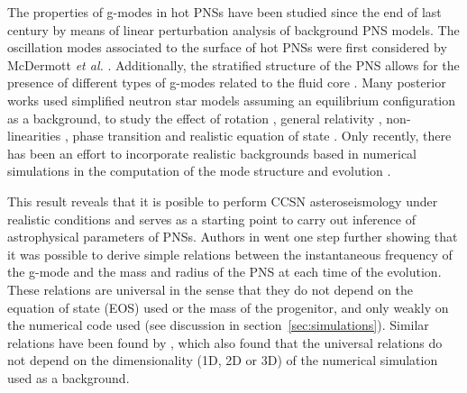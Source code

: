  
 The {properties of} g-modes in hot {PNSs} have been studied since the end of last century {by means of linear perturbation analysis of background PNS models}. The oscillation modes {associated to} the surface of hot PNSs were first considered by McDermott {\it et al.} \citep{McDermott:1983}. Additionally, the stratified structure of the PNS allows for the presence of different types of g-modes related to the fluid core \citep{Reisenegger:1992}. Many posterior works used simplified neutron star models assuming an equilibrium configuration {as a background}, to study the effect of rotation \citep{Ferrari:2004}, general relativity \citep{Passamonti:2005}, non-linearities \citep{Dimmelmeier:2006}, phase transition \citep{Kruger:2015} and realistic equation of state \citep{Camelio:2017}. {Only recently, there has been an effort to incorporate realistic backgrounds based in numerical simulations in the computation of the mode structure and evolution \citep{Sotani:2016,Torres:2018, Morozova:2018, Torres:2019a,Torres:2019b,Sotani:2019,WS:2019,Sotani:2020a, Sotani:2020b}}.
 
This result reveals that it is posible to perform CCSN asteroseismology {under realistic conditions} and serves as a starting point to carry out inference of astrophysical parameters of PNSs. Authors in {\citep{Torres:2019b} went one step further showing that it was possible to derive simple relations} between the instantaneous frequency of the g-mode and the mass and radius of the PNS {at each time of the evolution}. These relations are universal in the sense that they do not depend {on the equation of state (EOS) used} or the mass of the progenitor, {and only weakly on} the numerical code used {(see discussion in section~\ref{sec:simulations})}. {Similar relations have been found by \citep{Sotani:2020a,Sotani:2020b}, which also found that the universal relations do not depend on the dimensionality (1D, 2D or 3D) of the numerical simulation used as a background.}
 
